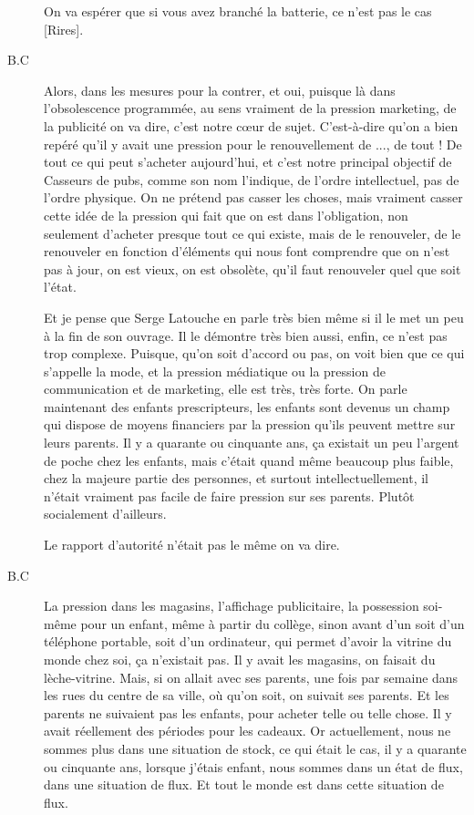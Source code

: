 \begin{description}
\vspace{1\baselineskip}

On va espérer que si vous avez branché la batterie, ce n'est pas le cas [Rires].

\vspace{1\baselineskip}

\item[B.C]Alors, dans les mesures pour la contrer, et oui, puisque là dans l'obsolescence programmée, au sens vraiment de la pression marketing, de la publicité on va dire, c'est notre cœur de sujet. C'est-à-dire qu'on a bien repéré qu'il y avait une pression pour le renouvellement de ..., de tout ! De tout ce qui peut s'acheter aujourd'hui, et c'est notre principal objectif de Casseurs de pubs, comme son nom l'indique, de l'ordre intellectuel, pas de l'ordre physique. On ne prétend pas casser les choses, mais vraiment casser cette idée de la pression qui fait que on est dans l'obligation, non seulement d'acheter presque tout ce qui existe, mais de le renouveler, de le renouveler en fonction d'éléments qui nous font comprendre que on n’est pas à jour, on est vieux, on est obsolète, qu'il faut renouveler quel que soit l'état.

Et je pense que Serge Latouche en parle très bien même si il le met un peu à la fin de son ouvrage. Il le démontre très bien aussi, enfin, ce n'est pas trop complexe. Puisque, qu'on soit d'accord ou pas, on voit bien que ce qui s'appelle la mode, et la pression médiatique ou la pression de communication et de marketing, elle est très, très forte. On parle maintenant des enfants prescripteurs, les enfants sont devenus un champ qui dispose de moyens financiers par la pression qu'ils peuvent mettre sur leurs parents. Il y a quarante ou cinquante ans, ça existait un peu l'argent de poche chez les enfants, mais c'était quand même beaucoup plus faible, chez la majeure partie des personnes, et surtout intellectuellement, il n'était vraiment pas facile de faire pression sur ses parents. Plutôt socialement d'ailleurs.

\vspace{1\baselineskip}

Le rapport d'autorité n'était pas le même on va dire.

\vspace{1\baselineskip}

\item[B.C]La pression dans les magasins, l'affichage publicitaire, la possession soi-même pour un enfant, même à partir du collège, sinon avant d'un soit d'un téléphone portable, soit d'un ordinateur, qui permet d'avoir la vitrine du monde chez soi, ça n'existait pas. Il y avait les magasins, on faisait du lèche-vitrine. Mais, si on allait avec ses parents, une fois par semaine dans les rues du centre de sa ville, où qu'on soit, on suivait ses parents. Et les parents ne suivaient pas les enfants, pour acheter telle ou telle chose. Il y avait réellement des périodes pour les cadeaux. Or actuellement, nous ne sommes plus dans une situation de stock, ce qui était le cas, il y a quarante ou cinquante ans, lorsque j'étais enfant, nous sommes dans un état de flux, dans une situation de flux. Et tout le monde est dans cette situation de flux. 


\end{description}
